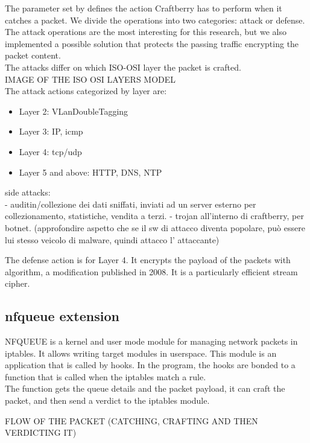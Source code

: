 \documentclass[12pt]{article}
\begin{document}
	The parameter set by  defines the action Craftberry has to perform when it catches a packet. We divide the operations into two categories: attack or defense. The attack operations are the most interesting for this research, but we also implemented a possible solution that protects the passing traffic encrypting the packet content.\\
	The attacks differ on which ISO-OSI layer the packet is crafted.\\

	IMAGE OF THE ISO OSI LAYERS MODEL\\
	
	The attack actions categorized by layer are:
	\begin{itemize}
		\item Layer 2: VLanDoubleTagging
		\item Layer 3: IP, icmp
		\item Layer 4: tcp/udp
		\item Layer 5 and above: HTTP, DNS, NTP
	\end{itemize}
	
	side attacks:\\
	- auditin/collezione dei dati sniffati, inviati ad un server esterno per collezionamento, statistiche, vendita a terzi.
	- trojan all'interno di craftberry, per botnet. (approfondire aspetto che se il sw di attacco diventa popolare, può essere lui stesso veicolo di malware, quindi attacco l' attaccante)

	The defense action is for Layer 4. It encrypts the payload of the packets with  algorithm, a  modification published in 2008. It is a particularly efficient stream cipher.\\

	\subsection{nfqueue extension}
	NFQUEUE is a kernel and user mode module for managing network packets in iptables. It allows writing  target modules in userspace. This module is an application that is called by  hooks. In the program, the hooks are bonded to a function that is called when the iptables match a rule.\\
	The function gets the queue details and the packet payload, it can craft the packet, and then send a verdict to the iptables module. 

	FLOW OF THE PACKET (CATCHING, CRAFTING AND THEN VERDICTING IT)
\end{document}
